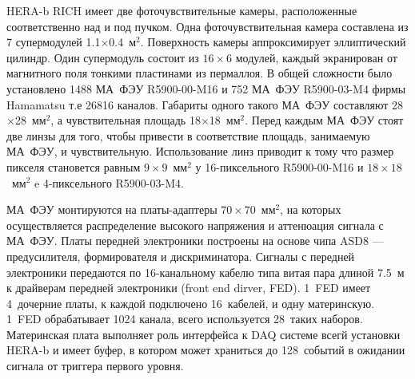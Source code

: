 
HERA-b RICH имеет две фоточувствительные камеры, расположенные соответственно над и под пучком. Одна фоточувствительная камера составлена из 7 супермодулей 1.1$\times$0.4~м$^2$. Поверхность камеры аппроксимирует эллиптический цилиндр. Один супермодуль состоит из $16 \times 6$ модулей, каждый экранирован от магнитного поля тонкими пластинами из пермаллоя. В общей сложности было установлено 1488 МА~ФЭУ R5900-00-M16 и 752 МА~ФЭУ R5900-03-M4 фирмы Hamamatsu т.е 26816 каналов. Габариты одного такого МА~ФЭУ составляют 28$\times$28~мм$^2$, а чувствительная площадь 18$\times$18~мм$^2$. Перед каждым МА~ФЭУ стоят две линзы для того, чтобы привести в соответствие площадь, занимаемую МА~ФЭУ, и чувствительную. Использование линз приводит к тому что размер пикселя становется равным $9 \times 9$~мм$^2$ у 16-пиксельного R5900-00-M16 и $18 \times 18$~мм$^2$ e 4-пиксельного R5900-03-M4.

МА~ФЭУ монтируются на платы-адаптеры $70 \times 70$~мм$^2$, на которых осуществляется распределение высокого напряжения и аттенюация сигнала с МА~ФЭУ. Платы передней электроники построены на основе чипа ASD8 --- предусилителя, формирователя и дискриминатора. Сигналы с передней электроники передаются по 16-канальному кабелю типа витая пара длиной 7.5~м к драйверам передней электроники (front end dirver, FED). 1~FED имеет 4~дочерние платы, к каждой подключено 16~кабелей, и одну материнскую. 1~FED обрабатывает 1024 канала, всего используется 28~таких наборов. Материнская плата выполняет роль интерфейса к DAQ системе всегй установки HERA-b и имеет буфер, в котором может храниться до 128~событий в ожидании сигнала от триггера первого уровня.


